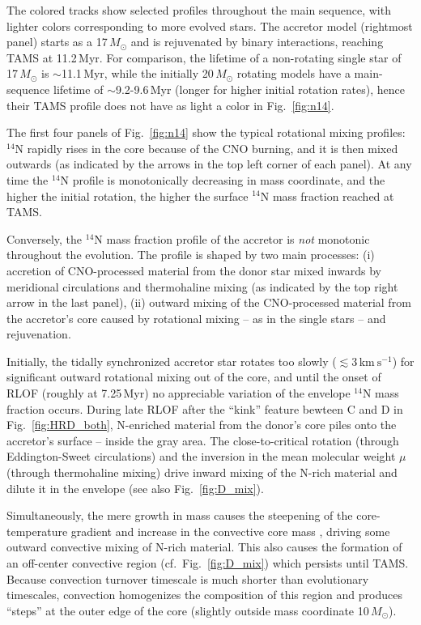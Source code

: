 \documentclass[twocolumn,twocolappendix,trackchanges]{aastex63}
\newcommand{\kms}{{\mathrm{km\ s^{-1}}}}
\DeclareRobustCommand{\Figref}[1]{Fig.~\ref{#1}}
\begin{document}
The colored tracks show selected profiles throughout the main
sequence, with lighter colors corresponding to more evolved stars. The
accretor model (rightmost panel) starts as a 17$\,M_\odot$ and is
rejuvenated by binary interactions, reaching TAMS at
11.2\,Myr. For comparison, the lifetime of a non-rotating single star
of 17\,$M_\odot$ is $\sim$11.1\,Myr, while the initially 20\,$M_\odot$
rotating models have a main-sequence lifetime of $\sim$9.2-9.6\,Myr (longer
for higher initial rotation rates), hence their TAMS profile does not
have as light a color in \Figref{fig:n14}.

The first four panels of \Figref{fig:n14} show the typical rotational
mixing profiles: $^{14}\mathrm{N}$ rapidly rises in the core because
of the CNO burning, and it is then mixed outwards (as indicated by the
arrows in the top left corner of each panel). At any time
the $^{14}\mathrm{N}$ profile is monotonically decreasing in mass
coordinate, and the higher the initial rotation, the higher the
surface $^{14}\mathrm{N}$ mass fraction reached at TAMS.

Conversely, the $^{14}\mathrm{N}$ mass fraction profile of the
accretor is \emph{not} monotonic throughout the evolution.  The
profile is shaped by two main processes: (i) accretion of
CNO-processed material from the donor star mixed inwards by meridional
circulations and thermohaline mixing (as indicated by the top right arrow
in the last panel), (ii) outward mixing of the
CNO-processed material from the accretor's core caused by rotational
mixing -- as in the single stars -- and rejuvenation.

Initially, the tidally synchronized accretor star
rotates too slowly ($\lesssim 3\,\kms$) for significant outward rotational mixing out of
the core, and until the onset of RLOF (roughly at 7.25\,Myr) no appreciable variation of the
envelope $^{14}\mathrm{N}$ mass fraction occurs. During late RLOF after the
``kink'' feature bewteen C and D in \Figref{fig:HRD_both}, N-enriched material from the
donor's core piles onto the accretor's surface -- inside the gray
area. The close-to-critical
rotation (through Eddington-Sweet circulations) and the inversion in the mean molecular
weight $\mu$ (through thermohaline mixing) drive inward mixing of
the N-rich material and dilute it in the envelope (see also \Figref{fig:D_mix}).

Simultaneously, the mere growth in mass causes the steepening of the
core-temperature gradient and increase in the convective core mass
\citep[rejuvenation, e.g.,][]{schneider:16}, driving some outward
convective mixing of N-rich material. This also causes the formation
of an off-center convective region (cf.~\Figref{fig:D_mix}) which
persists until TAMS. Because convection turnover timescale is much
shorter than evolutionary timescales, convection homogenizes the
composition of this region and produces ``steps'' at
the outer edge of the core (slightly outside mass coordinate
10\,$M_\odot$).
\end{document}
